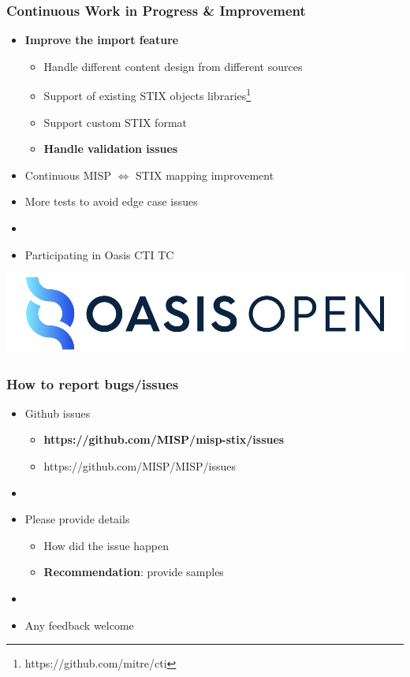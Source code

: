\begin{frame}
    \frametitle{Continuous Work in Progress \& Improvement}
    \begin{itemize}
        \item {\bf Improve the import feature}
        \begin{itemize}
            \item Handle different content design from different sources
            \item Support of existing STIX objects libraries\footnote{https://github.com/mitre/cti}
            \item Support custom STIX format
            \item \textbf{Handle validation issues}
        \end{itemize}
        \item Continuous MISP $\Longleftrightarrow$ STIX mapping improvement
        \item More tests to avoid edge case issues
        \item []
        \item Participating in Oasis CTI TC
    \end{itemize}
    \centering\includegraphics[scale=0.2]{images/oasis.png}
\end{frame}

\begin{frame}
    \frametitle{How to report bugs/issues}
    \begin{itemize}
        \item Github issues
        \begin{itemize}
            \item {\bf https://github.com/MISP/misp-stix/issues}
            \item https://github.com/MISP/MISP/issues
        \end{itemize}
        \item []
        \item Please provide details
        \begin{itemize}
            \item How did the issue happen
            \item {\bf Recommendation}: provide samples
        \end{itemize}
        \item[]
        \item Any feedback welcome
    \end{itemize}
\end{frame}

